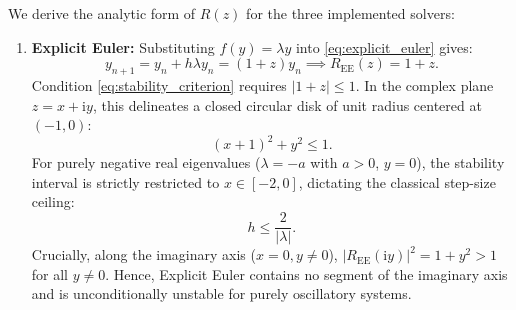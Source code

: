 \documentclass[11pt,a4paper]{article}
\theoremstyle{definition}
\theoremstyle{remark}
\begin{document}
We derive the analytic form of $R(z)$ for the three implemented solvers:
\begin{enumerate}
    \item \textbf{Explicit Euler:} Substituting $f(y) = \lambda y$ into \eqref{eq:explicit_euler} gives:
    \begin{equation}
    \label{eq:R_EE}
    y_{n+1} = y_n + h\lambda y_n = (1 + z) y_n \implies R_{\mathrm{EE}}(z) = 1 + z.
    \end{equation}
    Condition \eqref{eq:stability_criterion} requires $|1 + z| \le 1$. In the complex plane $z = x + \mathrm{i}y$, this delineates a closed circular disk of unit radius centered at $(-1, 0)$:
    \begin{equation}
    \label{eq:EE_boundary}
    (x + 1)^2 + y^2 \le 1.
    \end{equation}
    For purely negative real eigenvalues ($\lambda = -a$ with $a > 0$, $y = 0$), the stability interval is strictly restricted to $x \in [-2, 0]$, dictating the classical step-size ceiling:
    \begin{equation}
    \label{eq:h_crit_EE}
    h \le \frac{2}{|\lambda|}.
    \end{equation}
    Crucially, along the imaginary axis ($x = 0, y \ne 0$), $|R_{\mathrm{EE}}(\mathrm{i}y)|^2 = 1 + y^2 > 1$ for all $y \ne 0$. Hence, Explicit Euler contains no segment of the imaginary axis and is unconditionally unstable for purely oscillatory systems.


\end{enumerate}
\end{document}
